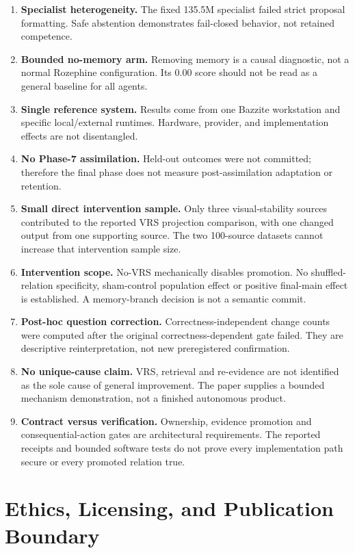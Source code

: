 \documentclass[11pt]{article}
\newcommand{\system}{Rozephine}
\begin{document}
\begin{enumerate}[leftmargin=1.5em]
  \item \textbf{Specialist heterogeneity.}  The fixed 135.5M specialist failed strict proposal formatting.  Safe abstention demonstrates fail-closed behavior, not retained competence.
  \item \textbf{Bounded no-memory arm.}  Removing memory is a causal diagnostic, not a normal \system{} configuration.  Its 0.00 score should not be read as a general baseline for all agents.
  \item \textbf{Single reference system.}  Results come from one Bazzite workstation and specific local/external runtimes.  Hardware, provider, and implementation effects are not disentangled.
  \item \textbf{No Phase-7 assimilation.}  Held-out outcomes were not committed; therefore the final phase does not measure post-assimilation adaptation or retention.
  \item \textbf{Small direct intervention sample.} Only three visual-stability sources contributed to the reported VRS projection comparison, with one changed output from one supporting source. The two 100-source datasets cannot increase that intervention sample size.
  \item \textbf{Intervention scope.} No-VRS mechanically disables promotion. No shuffled-relation specificity, sham-control population effect or positive final-main effect is established. A memory-branch decision is not a semantic commit.
  \item \textbf{Post-hoc question correction.} Correctness-independent change counts were computed after the original correctness-dependent gate failed. They are descriptive reinterpretation, not new preregistered confirmation.
  \item \textbf{No unique-cause claim.} VRS, retrieval and re-evidence are not identified as the sole cause of general improvement. The paper supplies a bounded mechanism demonstration, not a finished autonomous product.
  \item \textbf{Contract versus verification.} Ownership, evidence promotion and consequential-action gates are architectural requirements. The reported receipts and bounded software tests do not prove every implementation path secure or every promoted relation true.
\end{enumerate}

\section{Ethics, Licensing, and Publication Boundary}
\end{document}
